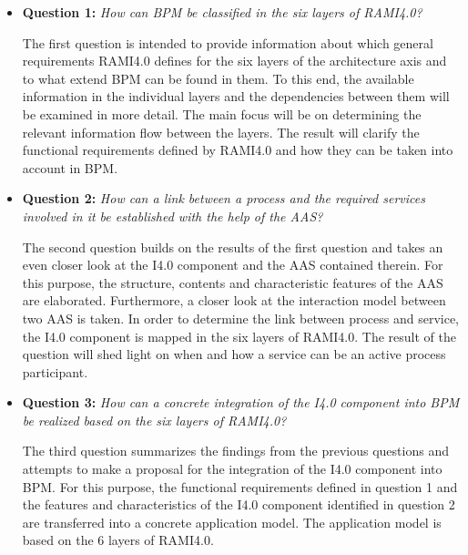 \begin{itemize}
    \item [] \textbf{Question 1:} \textit{How can \ac{BPM} be classified in the six layers of \ac{RAMI4.0}?}
    
    The first question is intended to provide information about which general requirements \ac{RAMI4.0} defines for the six layers of the architecture axis and to what extend \ac{BPM} can be found in them. To this end, the available information in the individual layers and the dependencies between them will be examined in more detail. The main focus will be on determining the relevant information flow between the layers. The result will clarify the functional requirements defined by \ac{RAMI4.0} and how they can be taken into account in \ac{BPM}.
    
    \item [] \textbf{Question 2:} \textit{How can a link between a process and the required services involved in it be established with the help of the \ac{AAS}?}
    
    The second question builds on the results of the first question and takes an even closer look at the \ac{I4.0} component and the \ac{AAS} contained therein. For this purpose, the structure, contents and characteristic features of the \ac{AAS} are elaborated. Furthermore, a closer look at the interaction model between two \ac{AAS} is taken. In order to determine the link between process and service, the \ac{I4.0} component is mapped in the six layers of \ac{RAMI4.0}. The result of the question will shed light on when and how a service can be an active process participant.
    
    \item[] \textbf{Question 3:} \textit{How can a concrete integration of the \ac{I4.0} component into BPM be realized based on the six layers of \ac{RAMI4.0}?}
    
    The third question summarizes the findings from the previous questions and attempts to make a proposal for the integration of the \ac{I4.0} component into BPM. For this purpose, the functional requirements defined in question 1 and the features and characteristics of the \ac{I4.0} component identified in question 2 are transferred into a concrete application model. The application model is based on the 6 layers of \ac{RAMI4.0}. 

\end{itemize}

